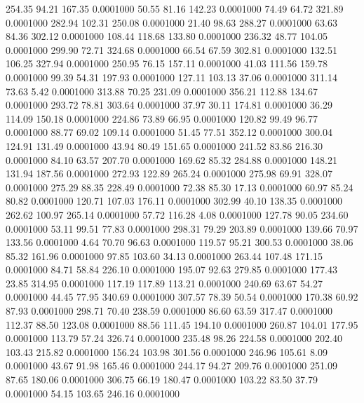  254.35   94.21  167.35   0.0001000
  50.55   81.16  142.23   0.0001000
  74.49   64.72  321.89   0.0001000
 282.94  102.31  250.08   0.0001000
  21.40   98.63  288.27   0.0001000
  63.63   84.36  302.12   0.0001000
 108.44  118.68  133.80   0.0001000
 236.32   48.77  104.05   0.0001000
 299.90   72.71  324.68   0.0001000
  66.54   67.59  302.81   0.0001000
 132.51  106.25  327.94   0.0001000
 250.95   76.15  157.11   0.0001000
  41.03  111.56  159.78   0.0001000
  99.39   54.31  197.93   0.0001000
 127.11  103.13   37.06   0.0001000
 311.14   73.63    5.42   0.0001000
 313.88   70.25  231.09   0.0001000
 356.21  112.88  134.67   0.0001000
 293.72   78.81  303.64   0.0001000
  37.97   30.11  174.81   0.0001000
  36.29  114.09  150.18   0.0001000
 224.86   73.89   66.95   0.0001000
 120.82   99.49   96.77   0.0001000
  88.77   69.02  109.14   0.0001000
  51.45   77.51  352.12   0.0001000
 300.04  124.91  131.49   0.0001000
  43.94   80.49  151.65   0.0001000
 241.52   83.86  216.30   0.0001000
  84.10   63.57  207.70   0.0001000
 169.62   85.32  284.88   0.0001000
 148.21  131.94  187.56   0.0001000
 272.93  122.89  265.24   0.0001000
 275.98   69.91  328.07   0.0001000
 275.29   88.35  228.49   0.0001000
  72.38   85.30   17.13   0.0001000
  60.97   85.24   80.82   0.0001000
 120.71  107.03  176.11   0.0001000
 302.99   40.10  138.35   0.0001000
 262.62  100.97  265.14   0.0001000
  57.72  116.28    4.08   0.0001000
 127.78   90.05  234.60   0.0001000
  53.11   99.51   77.83   0.0001000
 298.31   79.29  203.89   0.0001000
 139.66   70.97  133.56   0.0001000
   4.64   70.70   96.63   0.0001000
 119.57   95.21  300.53   0.0001000
  38.06   85.32  161.96   0.0001000
  97.85  103.60   34.13   0.0001000
 263.44  107.48  171.15   0.0001000
  84.71   58.84  226.10   0.0001000
 195.07   92.63  279.85   0.0001000
 177.43   23.85  314.95   0.0001000
 117.19  117.89  113.21   0.0001000
 240.69   63.67   54.27   0.0001000
  44.45   77.95  340.69   0.0001000
 307.57   78.39   50.54   0.0001000
 170.38   60.92   87.93   0.0001000
 298.71   70.40  238.59   0.0001000
  86.60   63.59  317.47   0.0001000
 112.37   88.50  123.08   0.0001000
  88.56  111.45  194.10   0.0001000
 260.87  104.01  177.95   0.0001000
 113.79   57.24  326.74   0.0001000
 235.48   98.26  224.58   0.0001000
 202.40  103.43  215.82   0.0001000
 156.24  103.98  301.56   0.0001000
 246.96  105.61    8.09   0.0001000
  43.67   91.98  165.46   0.0001000
 244.17   94.27  209.76   0.0001000
 251.09   87.65  180.06   0.0001000
 306.75   66.19  180.47   0.0001000
 103.22   83.50   37.79   0.0001000
  54.15  103.65  246.16   0.0001000
